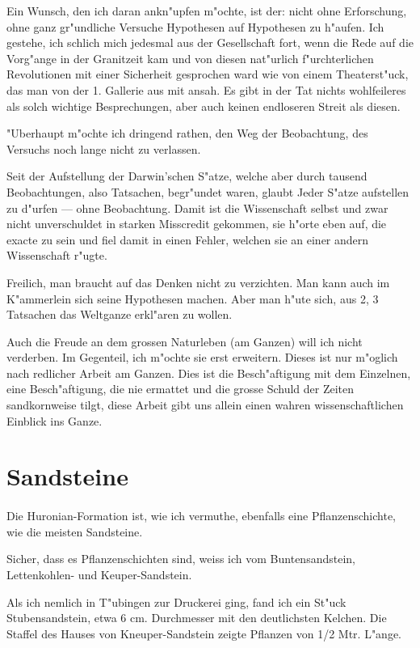 \documentclass[a4paper, 11pt, oneside, german]{article}
\begin{document}
Ein Wunsch, den ich daran ankn"upfen m"ochte, ist der: nicht ohne Erforschung, ohne ganz gr"undliche Versuche Hypothesen auf Hypothesen zu h"aufen. Ich gestehe, ich schlich mich jedesmal aus der Gesellschaft fort, wenn die Rede auf die Vorg"ange in der Granitzeit kam und von diesen nat"urlich f"urchterlichen Revolutionen mit einer Sicherheit gesprochen ward wie von einem Theaterst"uck, das man von der 1. Gallerie aus mit ansah. Es gibt in der Tat nichts wohlfeileres als solch wichtige Besprechungen, aber auch keinen endloseren Streit als diesen.

"Uberhaupt m"ochte ich dringend rathen, den Weg der Beobachtung, des Versuchs noch lange nicht zu verlassen.

Seit der Aufstellung der Darwin'schen S"atze, welche aber durch tausend Beobachtungen, also Tatsachen, begr"undet waren, glaubt Jeder S"atze aufstellen zu d"urfen --- ohne Beobachtung. Damit ist die Wissenschaft selbst und zwar nicht unverschuldet in starken Misscredit gekommen, sie h"orte eben auf, die exacte zu sein und fiel damit in einen Fehler, welchen sie an einer andern Wissenschaft r"ugte.

Freilich, man braucht auf das Denken nicht zu verzichten. Man kann auch im K"ammerlein sich seine Hypothesen machen. Aber man h"ute sich, aus 2, 3 Tatsachen das Weltganze erkl"aren zu wollen.

Auch die Freude an dem grossen Naturleben (am Ganzen) will ich nicht verderben. Im Gegenteil, ich m"ochte sie erst erweitern. Dieses ist nur m"oglich nach redlicher Arbeit am Ganzen. Dies ist die Besch"aftigung mit dem Einzelnen, eine Besch"aftigung, die nie ermattet und die grosse Schuld der Zeiten sandkornweise tilgt, diese Arbeit gibt uns allein einen wahren wissenschaftlichen Einblick ins Ganze.
\clearpage
\section{Sandsteine}
\paragraph{}
Die Huronian-Formation ist, wie ich vermuthe, ebenfalls eine Pflanzenschichte, wie die meisten Sandsteine.

Sicher, dass es Pflanzenschichten sind, weiss ich vom Buntensandstein, Lettenkohlen- und Keuper-Sandstein.

Als ich nemlich in T"ubingen zur Druckerei ging, fand ich ein St"uck Stubensandstein, etwa 6 cm. Durchmesser mit den deutlichsten Kelchen. Die Staffel des Hauses von Kneuper-Sandstein zeigte Pflanzen von 1/2 Mtr. L"ange.
\end{document}
